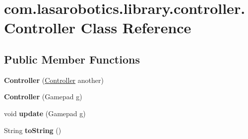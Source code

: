 \hypertarget{classcom_1_1lasarobotics_1_1library_1_1controller_1_1_controller}{}\section{com.\+lasarobotics.\+library.\+controller.\+Controller Class Reference}
\label{classcom_1_1lasarobotics_1_1library_1_1controller_1_1_controller}
\subsection*{Public Member Functions}
\begin{DoxyCompactItemize}
\item 
\hypertarget{classcom_1_1lasarobotics_1_1library_1_1controller_1_1_controller_ad22a8061296693d7bc9e1cd972ac5a43}{}{\bfseries Controller} (\hyperlink{classcom_1_1lasarobotics_1_1library_1_1controller_1_1_controller}{Controller} another)\label{classcom_1_1lasarobotics_1_1library_1_1controller_1_1_controller_ad22a8061296693d7bc9e1cd972ac5a43}

\item 
\hypertarget{classcom_1_1lasarobotics_1_1library_1_1controller_1_1_controller_a82f81ff6a865edb8f690996c3be4ced6}{}{\bfseries Controller} (Gamepad g)\label{classcom_1_1lasarobotics_1_1library_1_1controller_1_1_controller_a82f81ff6a865edb8f690996c3be4ced6}

\item 
\hypertarget{classcom_1_1lasarobotics_1_1library_1_1controller_1_1_controller_af16c1edc51ba9434813d2903ea2c9a60}{}void {\bfseries update} (Gamepad g)\label{classcom_1_1lasarobotics_1_1library_1_1controller_1_1_controller_af16c1edc51ba9434813d2903ea2c9a60}

\item 
\hypertarget{classcom_1_1lasarobotics_1_1library_1_1controller_1_1_controller_ae2bf7729ee77b242c22048c0f6735a2f}{}String {\bfseries to\+String} ()\label{classcom_1_1lasarobotics_1_1library_1_1controller_1_1_controller_ae2bf7729ee77b242c22048c0f6735a2f}

\end{DoxyCompactItemize}

